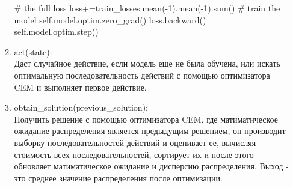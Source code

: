 \documentclass[a4paper,12pt]{article}
\begin{document}
\begin{enumerate}
\begin{enumerate}
\begin{python}
        # the full loss
        loss+=train_losses.mean(-1).mean(-1).sum()
        # train the model
        self.model.optim.zero_grad()
        loss.backward()
        self.model.optim.step()
\end{python}
\item act(state):\\
Даст случайное действие, если модель еще не была обучена, или искать оптимальную последовательность действий с помощью оптимизатора CEM и выполняет первое действие.
\item obtain\_solution(previous\_solution):\\
Получить решение с помощью оптимизатора CEM, где матиматическое ожидание распределения является предыдущим решением, он производит выборку последовательностей действий и оценивает ее, вычисляя стоимость всех последовательностей, сортирует их и после этого обновляет матиматическое ожидание и дисперсию распределения. Выход - это среднее значение распределения после оптимизации.\\


\end{enumerate}
\end{enumerate}
\end{document}

